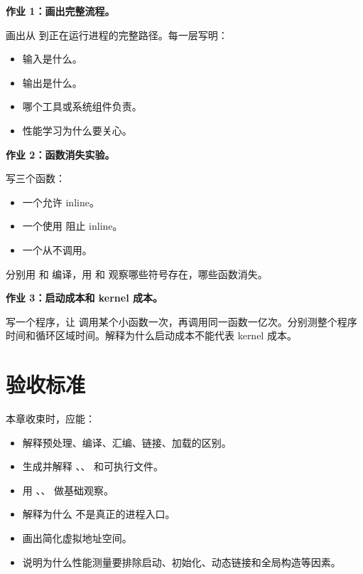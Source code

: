 \begin{exercisebox}
\textbf{作业 1：画出完整流程。}

画出从  到正在运行进程的完整路径。每一层写明：

\begin{itemize}
  \item 输入是什么。
  \item 输出是什么。
  \item 哪个工具或系统组件负责。
  \item 性能学习为什么要关心。
\end{itemize}

\textbf{作业 2：函数消失实验。}

写三个函数：

\begin{itemize}
  \item 一个允许 inline。
  \item 一个使用  阻止 inline。
  \item 一个从不调用。
\end{itemize}

分别用  和  编译，用  和  观察哪些符号存在，哪些函数消失。

\textbf{作业 3：启动成本和 kernel 成本。}

写一个程序，让  调用某个小函数一次，再调用同一函数一亿次。分别测整个程序时间和循环区域时间。解释为什么启动成本不能代表 kernel 成本。
\end{exercisebox}

\section{验收标准}

本章收束时，应能：

\begin{itemize}
  \item 解释预处理、编译、汇编、链接、加载的区别。
  \item 生成并解释 、、 和可执行文件。
  \item 用 、、 做基础观察。
  \item 解释为什么  不是真正的进程入口。
  \item 画出简化虚拟地址空间。
  \item 说明为什么性能测量要排除启动、初始化、动态链接和全局构造等因素。
\end{itemize}
